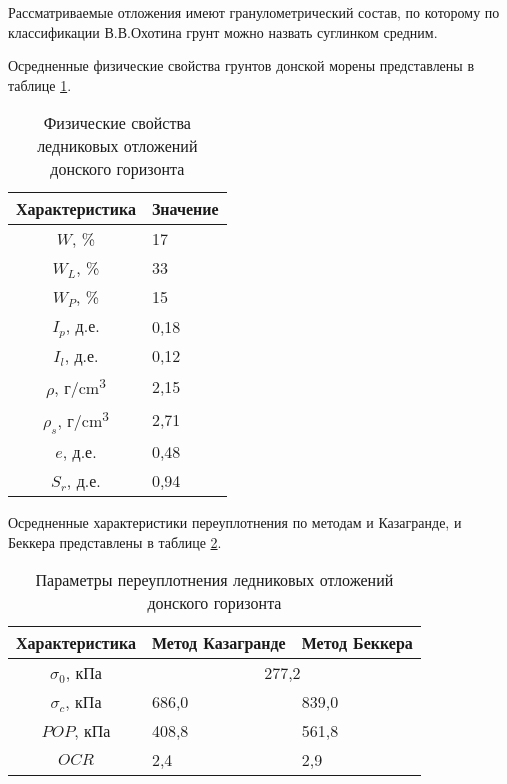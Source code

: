 Рассматриваемые отложения имеют 
гранулометрический состав, по которому по 
классификации В.В.Охотина грунт можно назвать 
суглинком средним. 

Осредненные физические свойства  грунтов 
донской морены представлены в таблице \ref{tab:donfiz}.

\begin{table}[ht!]
  \small
  \centering
  \caption{Физические свойства ледниковых отложений донского горизонта}\label{tab:donfiz}
  \begin{tabular}{|c|l|}
  \hline
  \multicolumn{1}{|l|}{Характеристика} & Значение \\ \hline
  $W$, \%                                & 17       \\ \hline
  $W_L$, \%                               & 33       \\ \hline
  $W_P$, \%                               & 15       \\ \hline
  $I_p$, д.е.                             & 0,18     \\ \hline
  $I_l$, д.е.                             & 0,12     \\ \hline
  $\rho$, г/\si{\centi\meter^3}                             & 2,15     \\ \hline
  $\rho_s$, г/\si{\centi\meter^3}                            & 2,71     \\ \hline
  $e$, д.е.                              & 0,48     \\ \hline
  $S_r$, д.е.                             & 0,94     \\ \hline
  \end{tabular}
  \end{table}
 
 Осредненные характеристики 
 переуплотнения по методам и Казагранде, 
 и Беккера представлены в таблице \ref{tab:donmeh}.

 \begin{table}[ht!]
  \small
  \centering
  \caption{Параметры переуплотнения ледниковых отложений донского горизонта}\label{tab:donmeh}
  \begin{tabular}{|c|l|l|}
  \hline
  \multicolumn{1}{|l|}{Характеристика} & Метод Казагранде & Метод Беккера \\ \hline
  $\sigma_0$, кПа                              & \multicolumn{2}{c|}{277,2}       \\ \hline
  $\sigma_c$, кПа                              & 686,0            & 839,0         \\ \hline
  $POP$, кПа                             & 408,8            & 561,8         \\ \hline
  $OCR$                                  & 2,4              & 2,9           \\ \hline
  \end{tabular}
  \end{table}
